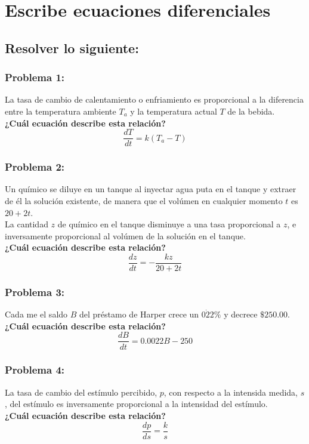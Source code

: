 \documentclass[letterpaper, 12pt]{article}
\begin{document}
\setcounter{page}{1}
\thispagestyle{fancy}
\section*{Escribe ecuaciones diferenciales}
\subsection*{Resolver lo siguiente:}
\subsubsection*{Problema 1:}
La tasa de cambio de calentamiento o enfriamiento es proporcional a la diferencia entre la temperatura ambiente
\(T_a\) y la temperatura actual \(T\) de la bebida. 
\\\newline
\textbf{¿Cuál ecuación describe esta relación?}
\[\frac{dT}{dt}=k(T_a-T)\]
\subsubsection*{Problema 2:}
Un químico se diluye en un tanque al inyectar agua puta en el tanque y extraer de él la solución existente, de manera que el volúmen en cualquier
momento \(t\) es \(20+2t\).
\\\newline
La cantidad \(z\) de químico en el tanque disminuye a una tasa proporcional a \(z\), e inversamente proporcional al volúmen de la solución en el tanque.
\\\newline
\textbf{¿Cuál ecuación describe esta relación?}
\[\frac{dz}{dt}=-\frac{kz}{20+2t}\]
\subsubsection*{Problema 3:}
Cada me el saldo \(B\) del préstamo de Harper crece un \(0\dot22\%\) y decrece \(\$250.00\).
\\\newline
\textbf{¿Cuál ecuación describe esta relación?}
\[\frac{dB}{dt}=0.0022B-250\]
\subsubsection*{Problema 4:}
La tasa de cambio del estímulo percibido, \(p\), con respecto a la intensida medida, \(s\), del estímulo es inversamente proporcional a la intensidad del estímulo.
\\\newline
\textbf{¿Cuál ecuación describe esta relación?}
\[\frac{dp}{ds}=\frac{k}{s}\]
\end{document}
